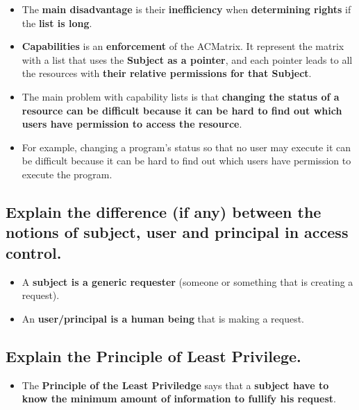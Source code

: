 \documentclass[9pt, letterpaper]{article}
\begin{document}
\begin{itemize}
	\item The \textbf{main disadvantage} is their \textbf{inefficiency} when \textbf{determining rights} if the \textbf{list is long}.
	\item \textbf{Capabilities} is an \textbf{enforcement} of the ACMatrix. It represent the matrix with a list that uses the \textbf{Subject as a pointer}, and each pointer leads to all the resources with \textbf{their relative permissions for that Subject}.
	\item The main problem with capability lists is that \textbf{changing the status of a resource can be difficult because it can be hard to find out which users have permission to access the resource}.
	\item For example, changing a program’s status so that no user may execute it can be difficult because it can be hard to find out which users have permission to execute the program.
\end{itemize}

\subsection{Explain the difference (if any) between the notions of subject, user and principal in access control.}
\begin{itemize}
	\item A \textbf{subject is a generic requester} (someone or something that is creating a request).
	\item An \textbf{user/principal is a human being} that is making a request.
\end{itemize}

\subsection{Explain the Principle of Least Privilege.}
\begin{itemize}
	\item The \textbf{Principle of the Least Priviledge} says that a \textbf{subject have to know the minimum amount of information to fullify his request}.
\end{itemize}
\end{document}
